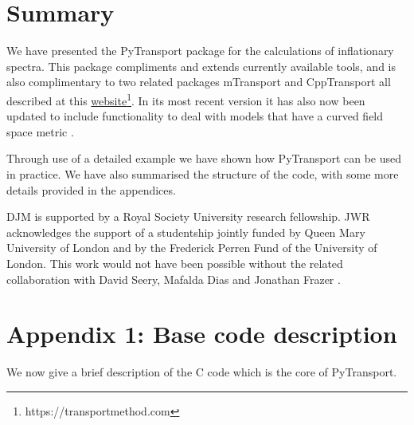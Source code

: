 \documentclass[10pt,
amsmath,amssymb,
aps,prd,nofootinbib,eqsecnum,a4paper]{revtex4}
\newcommand{\CC}{C\nolinebreak\hspace{-.05em}\raisebox{.4ex}{\tiny\bf +}\nolinebreak\hspace{-.10em}\raisebox{.4ex}{\tiny\bf +}}
\def\CC{{C\nolinebreak[4]\hspace{-.05em}\raisebox{.4ex}{\tiny\bf ++}}}
\def\S{ }
\begin{document}
\section{Summary}

We have presented the PyTransport package for the calculations of inflationary spectra. This package 
compliments and extends currently available tools, and is also complimentary to two related packages 
mTransport \cite{Dias:2015rca} and CppTransport \cite{xxx,xxx2}  all described at this \href{https://transportmethod.com}{website}\footnote{https://transportmethod.com}. In its most recent version it has also now been updated to include 
functionality to deal with models that have a curved field space metric \cite{newPaper}.

Through use of a detailed example we have shown how PyTransport can be used in practice. We have also summarised the structure of the code, with some more details provided in the appendices.

\begin{acknowledgments}
DJM is supported by a Royal Society University research fellowship. JWR acknowledges the support of a studentship 
jointly funded by Queen Mary University 
of London and by the Frederick Perren Fund of the University of London. This work would not have been possible without 
the related collaboration with David Seery, Mafalda Dias and Jonathan Frazer \cite{xxx}.
\end{acknowledgments}


\section*{Appendix 1:  Base code description}
We now give a brief description of the \CC \S  code which is the core of PyTransport. 
\end{document}
